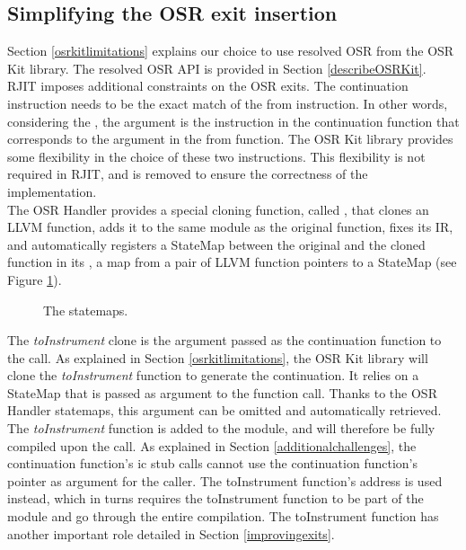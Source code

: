 \subsection{Simplifying the OSR exit insertion}

Section \ref{osrkitlimitations} explains our choice to use resolved OSR from the OSR Kit\cite{OSRKit} library.
The resolved OSR API is provided in Section \ref{describeOSRKit}.\\

RJIT imposes additional constraints on the OSR exits. 
The continuation instruction needs to be the exact match of the from instruction.
In other words, considering the , the  argument is the instruction in the continuation function that corresponds to the  argument in the from function.
The OSR Kit library provides some flexibility in the choice of these two instructions. 
This flexibility is not required in RJIT, and is removed to ensure the correctness of the implementation.\\

The OSR Handler provides a special cloning function, called , that clones an LLVM function, adds it to the same module as the original function, fixes its IR, and automatically registers a StateMap between the original and the cloned function in its , a map from a pair of LLVM function pointers to a StateMap (see Figure \ref{fig:statemaps}).\\

\begin{figure}[h]
\caption{The statemaps.}
\label{fig:statemaps}
\end{figure}

The \textit{toInstrument} clone is the argument passed as the continuation function to the  call.
As explained in Section \ref{osrkitlimitations}, the OSR Kit library will clone the \textit{toInstrument} function to generate the continuation.
It relies on a StateMap that is passed as argument to the function call. 
Thanks to the OSR Handler statemaps, this argument can be omitted and automatically retrieved.\\

The \textit{toInstrument} function is added to the module, and will therefore be fully compiled upon the  call.
As explained in Section \ref{additionalchallenges}, the continuation function's ic stub calls cannot use the continuation function's pointer as argument for the caller. 
The toInstrument function's address is used instead, which in turns requires the toInstrument function to be part of the module and go through the entire compilation.
The toInstrument function has another important role detailed in Section \ref{improvingexits}.\\

